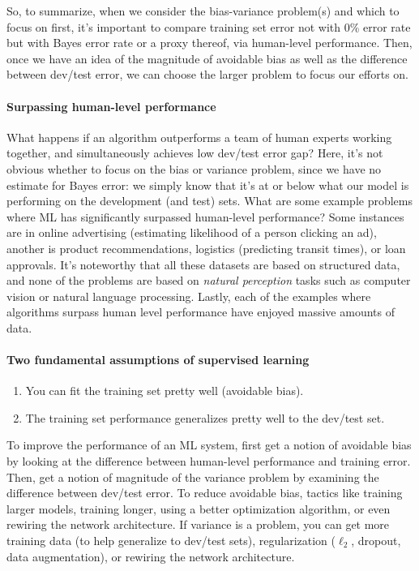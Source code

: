 \documentclass[12pt]{article}
\begin{document}
So, to summarize, when we consider the bias-variance problem(s) and which to focus on first, it's important to compare
training set error not with 0\% error rate but with Bayes error rate or a proxy thereof, via human-level performance.
Then, once we have an idea of the magnitude of avoidable bias as well as the difference between dev/test error, we can
choose the larger problem to focus our efforts on.

\paragraph{Surpassing human-level performance} What happens if an algorithm outperforms a team of human experts working together, and simultaneously achieves low dev/test error gap? Here, it's not obvious whether to focus on the bias or variance problem, since we have no estimate for Bayes error: we simply know that it's at or below what our model is performing on the development (and test) sets. What are some example problems where ML has significantly surpassed human-level performance? Some instances are in online advertising (estimating likelihood of a person clicking an ad), another is product recommendations, logistics (predicting transit times), or loan approvals. It's noteworthy that all
these datasets are based on structured data, and none of the problems are based on \emph{natural perception}
tasks such as computer vision or natural language processing. Lastly, each of the examples where algorithms surpass human level performance have enjoyed massive amounts of data. 

\paragraph{Two fundamental assumptions of supervised learning}
\begin{enumerate}   \item You can fit the training set pretty well (avoidable bias).
  \item The training set performance generalizes pretty well to the dev/test set. \end{enumerate}
To improve the performance of an ML system, first get a notion of avoidable bias
by looking at the difference between human-level performance and training error.
Then, get a notion of magnitude of the variance problem by examining the difference
between dev/test error. To reduce avoidable bias, tactics like training larger models, training longer, using a better optimization algorithm, or even rewiring the network architecture.  If variance is a problem, you can get more training data (to help generalize to dev/test sets), regularization ($\ell_2$, dropout, data augmentation), or rewiring the network architecture. 
\end{document}
